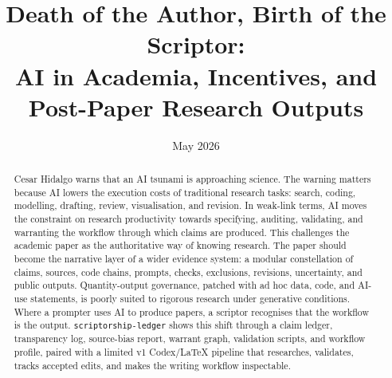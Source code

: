 \documentclass[11pt]{article}
\title{Death of the Author, Birth of the Scriptor:\\ \large AI in Academia, Incentives, and Post-Paper Research Outputs\protect\footnotemark[1]\protect\footnotemark[2]}
\author{}
\date{May 2026\protect\footnotemark[3]}
\begin{document}
\maketitle
{}

\begin{abstract}
Cesar Hidalgo warns that an AI tsunami is approaching science. The warning matters because AI lowers the execution costs of traditional research tasks: search, coding, modelling, drafting, review, visualisation, and revision. In weak-link terms, AI moves the constraint on research productivity towards specifying, auditing, validating, and warranting the workflow through which claims are produced. This challenges the academic paper as the authoritative way of knowing research. The paper should become the narrative layer of a wider evidence system: a modular constellation of claims, sources, code chains, prompts, checks, exclusions, revisions, uncertainty, and public outputs. Quantity-output governance, patched with ad hoc data, code, and AI-use statements, is poorly suited to rigorous research under generative conditions. Where a prompter uses AI to produce papers, a scriptor recognises that the workflow is the output. \texttt{scriptorship-ledger} shows this shift through a claim ledger, transparency log, source-bias report, warrant graph, validation scripts, and workflow profile, paired with a limited v1 Codex/LaTeX pipeline that researches, validates, tracks accepted edits, and makes the writing workflow inspectable.
\vspace{5.5cm}
\end{abstract}
\setcounter{footnote}{3}

\pagebreak













\pagebreak


\end{document}
